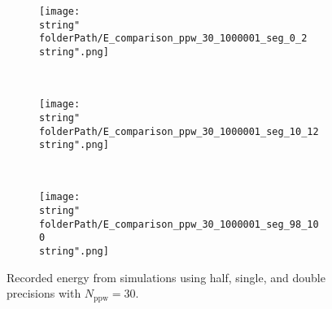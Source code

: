 \begin{minipage}[t]{.5\textwidth}
%
\begin{figure}[H]
\captionsetup{width=0.95\textwidth,font=footnotesize,labelfont=footnotesize}
\centering
%
\begin{subfigure}[b]{1\textwidth}
%
\centering\texttt{[image: \\string"\\folderPath/E\_comparison\_ppw\_30\_1000001\_seg\_0\_2\\string".png]}
%
\end{subfigure}\hfill
\\[2ex]
%
\begin{subfigure}[b]{1\textwidth}
%
\centering\texttt{[image: \\string"\\folderPath/E\_comparison\_ppw\_30\_1000001\_seg\_10\_12\\string".png]}
%
\end{subfigure}\hfill
\\[2ex]
%
\begin{subfigure}[b]{1\textwidth}
%
\centering\texttt{[image: \\string"\\folderPath/E\_comparison\_ppw\_30\_1000001\_seg\_98\_100\\string".png]}
%
\end{subfigure}\hfill
%
\caption{Recorded energy from simulations using half, single, and double precisions with $N_\text{ppw}=30$.}
\label{comparison_E_half_naive_segments_ppw_30}
\end{figure}
%
\end{minipage}


\renewcommand{\folderPath}{\string"/dev/null\string"}